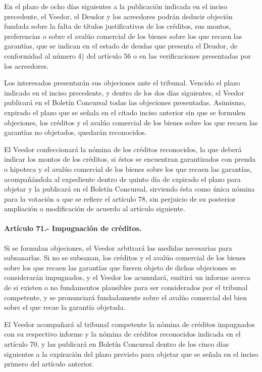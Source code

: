 \documentclass[
]{book}
\begin{document}
En el plazo de ocho días siguientes a la publicación indicada en el inciso precedente, el Veedor, el Deudor y los acreedores podrán deducir objeción fundada sobre la falta de títulos justificativos de los créditos, sus montos, preferencias o sobre el avalúo comercial de los bienes sobre los que recaen las garantías, que se indican en el estado de deudas que presenta el Deudor, de conformidad al número 4) del artículo 56 o en las verificaciones presentadas por los acreedores.

Los interesados presentarán sus objeciones ante el tribunal. Vencido el plazo indicado en el inciso precedente, y dentro de los dos días siguientes, el Veedor publicará en el Boletín Concursal todas las objeciones presentadas. Asimismo, expirado el plazo que se señala en el citado inciso anterior sin que se formulen objeciones, los créditos y el avalúo comercial de los bienes sobre los que recaen las garantías no objetados, quedarán reconocidos.

El Veedor confeccionará la nómina de los créditos reconocidos, la que deberá indicar los montos de los créditos, si éstos se encuentran garantizados con prenda o hipoteca y el avalúo comercial de los bienes sobre los que recaen las garantías, acompañándola al expediente dentro de quinto día de expirado el plazo para objetar y la publicará en el Boletín Concursal, sirviendo ésta como única nómina para la votación a que se refiere el artículo 78, sin perjuicio de su posterior ampliación o modificación de acuerdo al artículo siguiente.

\hypertarget{artuxedculo-71.--impugnaciuxf3n-de-cruxe9ditos.}{%
\paragraph*{Artículo 71.- Impugnación de créditos.}\label{artuxedculo-71.--impugnaciuxf3n-de-cruxe9ditos.}}

Si se formulan objeciones, el Veedor arbitrará las medidas necesarias para subsanarlas. Si no se subsanan, los créditos y el avalúo comercial de los bienes sobre los que recaen las garantías que fueren objeto de dichas objeciones se considerarán impugnados, y el Veedor los acumulará, emitirá un informe acerca de si existen o no fundamentos plausibles para ser considerados por el tribunal competente, y se pronunciará fundadamente sobre el avalúo comercial del bien sobre el que recae la garantía objetada.

El Veedor acompañará al tribunal competente la nómina de créditos impugnados con su respectivo informe y la nómina de créditos reconocidos indicada en el artículo 70, y las publicará en Boletín Concursal dentro de los cinco días siguientes a la expiración del plazo previsto para objetar que se señala en el inciso primero del artículo anterior.
\end{document}
